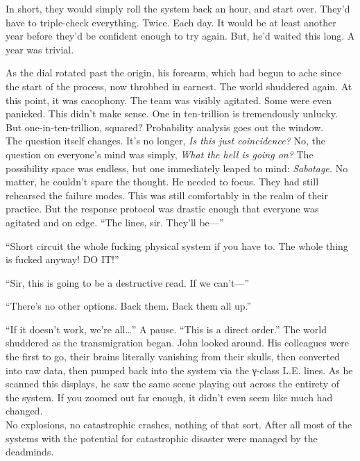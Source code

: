 In short, they would simply roll the system back an hour, and start over. They’d have to triple-check everything. Twice. Each day. It would be at least another year before they’d be confident enough to try again. But, he’d waited this long. A year was trivial.

As the dial rotated past the origin, his forearm, which had begun to ache since the start of the process, now throbbed in earnest.
\simpleline
The world shuddered again.
\simpleline
At this point, it was cacophony. The team was visibly agitated. Some were even panicked. This didn’t make sense.
\SmallVSpace
One in ten-trillion is tremendously unlucky. But one-in-ten-trillion, squared? Probability analysis goes out the window.\\The question itself changes. It’s no longer, \emph{Is this just coincidence?} No, the question on everyone’s mind was simply, \emph{What the hell is going on?}  The possibility space was endless, but one immediately leaped to mind: \emph{Sabotage.} No matter, he couldn’t spare the thought. He needed to focus. They had still rehearsed the failure modes. This was still comfortably in the realm of their practice.  But the response protocol was drastic enough that everyone was agitated and on edge.
\SmallVSpace
“The lines, sir. They’ll be\mbox{---}”

“Short circuit the whole fucking physical system if you have to. The whole thing is fucked anyway! DO IT!”

“Sir, this is going to be a destructive read. If we can’t\mbox{---}”

“There’s no other options. Back them. Back them all up.”

“If it doesn’t work, we’re all…”
\SomeVSpace
A pause.
\SomeVSpace
“This is a direct order.”
\simpleline
The world shuddered as the transmigration began.
\simpleline
John looked around. His colleagues were the first to go, their brains literally vanishing from their skulls, then converted into raw data, then pumped back into the system via the γ-class L.E. lines. As he scanned this displays, he saw the same scene playing out across the entirety of the system. If you zoomed out far enough, it didn’t even seem like much had changed.\\No explosions, no catastrophic crashes, nothing of that sort. After all most of the systems with the potential for catastrophic disaster were managed by the deadminds.

